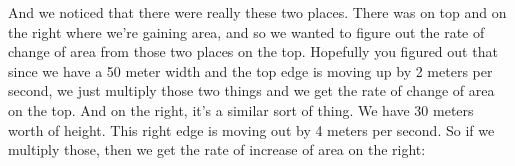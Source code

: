 \documentclass[pdftex, brazil, 12pt, twoside]{article}
\begin{document}
\begin{figure}[H]
  \begin{center}
  \end{center}
\end{figure}

And we noticed that there were really these two places.
There was on top and on the right where we're gaining area,
and so we wanted to figure out the rate of change of area
from those two places on the top.
Hopefully you figured out that since we have a 50 meter width
and the top edge is moving up by 2 meters per second,
we just multiply those two things
and we get the rate of change of area on the top.
And on the right, it's a similar sort of thing.
We have 30 meters worth of height.
This right edge is moving out by 4 meters per second.
So if we multiply those, then we get the rate
of increase of area on the right:

\begin{figure}[H]
  \begin{center}
  \end{center}
\end{figure}
\end{document}
